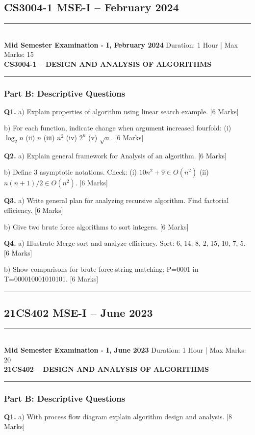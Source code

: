 \documentclass[11pt,a4paper]{article}
\newcommand{\examheader}[4]{
\noindent\rule{\textwidth}{0.5pt}\\
\textbf{#1} \hfill Duration: #3 | Max Marks: #4\\
\textbf{#2}\\
\rule{\textwidth}{0.5pt}
\vspace{0.2cm}
}
\begin{document}
\subsection{CS3004-1 MSE-I -- February 2024}
\examheader{Mid Semester Examination - I, February 2024}{CS3004-1 -- DESIGN AND ANALYSIS OF ALGORITHMS}{1 Hour}{15}

\subsubsection*{Part B: Descriptive Questions}

\textbf{Q1.} a) Explain properties of algorithm using linear search example. \hfill [6 Marks]

b) For each function, indicate change when argument increased fourfold: (i) $\log_2 n$ (ii) $n$ (iii) $n^2$ (iv) $2^n$ (v) $\sqrt{n}$. \hfill [6 Marks]

\textbf{Q2.} a) Explain general framework for Analysis of an algorithm. \hfill [6 Marks]

b) Define 3 asymptotic notations. Check: (i) $10n^2 + 9 \in O(n^2)$ (ii) $n(n+1)/2 \in O(n^2)$. \hfill [6 Marks]

\textbf{Q3.} a) Write general plan for analyzing recursive algorithm. Find factorial efficiency. \hfill [6 Marks]

b) Give two brute force algorithms to sort integers. \hfill [6 Marks]

\textbf{Q4.} a) Illustrate Merge sort and analyze efficiency. Sort: 6, 14, 8, 2, 15, 10, 7, 5. \hfill [6 Marks]

b) Show comparisons for brute force string matching: P=0001 in T=000010001010101. \hfill [6 Marks]

\vspace{0.5cm}
\hrule
\vspace{0.5cm}

\subsection{21CS402 MSE-I -- June 2023}
\examheader{Mid Semester Examination - I, June 2023}{21CS402 -- DESIGN AND ANALYSIS OF ALGORITHMS}{1 Hour}{20}

\subsubsection*{Part B: Descriptive Questions}

\textbf{Q1.} a) With process flow diagram explain algorithm design and analysis. \hfill [8 Marks]
\end{document}
